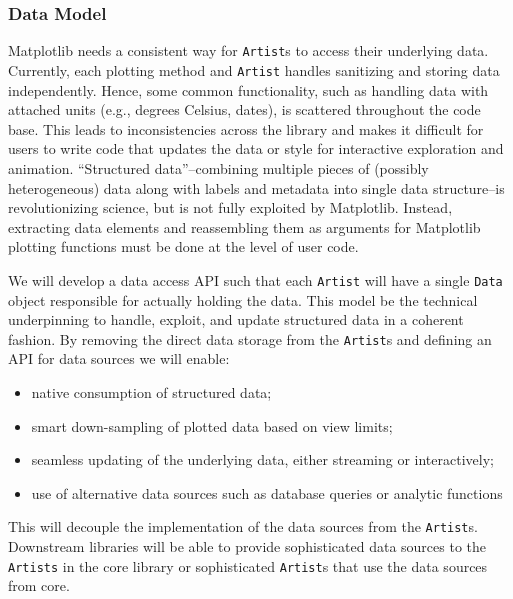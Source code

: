 \documentclass[11pt,letterpaper]{article}  %
\begin{document}
\subsubsection{Data Model}
\label{sec:dm}

Matplotlib needs a consistent way for \texttt{Artist}s to access their
underlying data.
Currently, each plotting method and \texttt{Artist} handles sanitizing
and storing data independently.
Hence, some common functionality, such as handling data with attached
units (e.g., degrees Celsius, dates), is scattered throughout the code
base.
This leads to inconsistencies across the library and makes it
difficult for users to write code that updates the data or style for interactive
exploration and animation.
``Structured data''--combining multiple pieces of (possibly
heterogeneous) data along with labels and metadata into single data
structure--is revolutionizing science, but is not fully exploited by
Matplotlib.
Instead, extracting
data elements and reassembling them as arguments for Matplotlib plotting
functions must be done at the level of user code.



We will develop a data access API such that each \texttt{Artist} will
have a single \texttt{Data} object responsible for actually holding the data.
This model be the technical underpinning to handle, exploit, and
update structured data in a coherent fashion.
By removing the direct data storage from
the \texttt{Artist}s and defining an API for data sources we will enable:
\begin{itemize}[noitemsep]
  \item native consumption of structured data;
  \item smart down-sampling of plotted data based on view limits;
  \item seamless updating of the underlying data, either
    streaming or interactively;
  \item use of alternative data sources such as database queries or analytic functions
\end{itemize}
This will decouple the implementation of the data sources from the
\texttt{Artist}s.  Downstream libraries will be able to provide
sophisticated data sources to the \texttt{Artists} in the core library
or sophisticated \texttt{Artist}s that use the data sources from
core.
\end{document}
